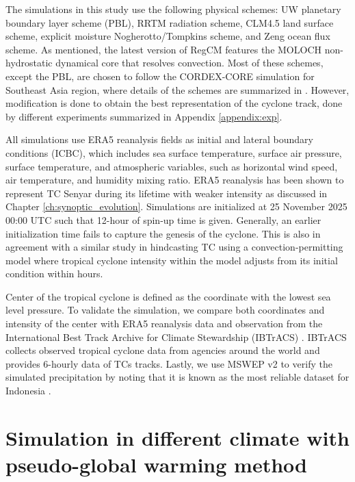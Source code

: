 The simulations in this study use the following physical schemes: UW planetary boundary layer scheme (PBL), RRTM radiation scheme, CLM4.5 land surface scheme, explicit moisture Nogherotto/Tompkins scheme, and Zeng ocean flux scheme. As mentioned, the latest version of RegCM features the MOLOCH non-hydrostatic dynamical core that resolves convection. Most of these schemes, except the PBL, are chosen to follow the CORDEX-CORE simulation for Southeast Asia region, where details of the schemes are summarized in \citet{coppola20255th}. However, modification is done to obtain the best representation of the cyclone track, done by different experiments summarized in Appendix \ref{appendix:exp}.

All simulations use ERA5 reanalysis fields \citep{hersbach2020era5} as initial and lateral boundary conditions (ICBC), which includes sea surface temperature, surface air pressure, surface temperature, and atmospheric variables, such as horizontal wind speed, air temperature, and humidity mixing ratio. ERA5 reanalysis has been shown to represent TC Senyar during its lifetime with weaker intensity as discussed in Chapter \ref{ch:synoptic_evolution}. Simulations are initialized at 25 November 2025 00:00 UTC such that 12-hour of spin-up time is given. Generally, an earlier initialization time fails to capture the genesis of the cyclone. This is also in agreement with a similar study in hindcasting TC \citep{patricola2018anthropogenic} using a convection-permitting model where tropical cyclone intensity within the model adjusts from its initial condition within hours.

Center of the tropical cyclone is defined as the coordinate with the lowest sea level pressure. To validate the simulation, we compare both coordinates and intensity of the center with ERA5 reanalysis data and observation from the International Best Track Archive for Climate Stewardship (IBTrACS) \citep{knapp2010international, IBTrACS_data}. IBTrACS collects observed tropical cyclone data from agencies around the world and provides 6-hourly data of TCs tracks. Lastly, we use MSWEP v2 \citep{beck2019mswep} to verify the simulated precipitation by noting that it is known as the most reliable dataset for Indonesia \citep{wati2022statistics}.

\section{Simulation in different climate with pseudo-global warming method}

